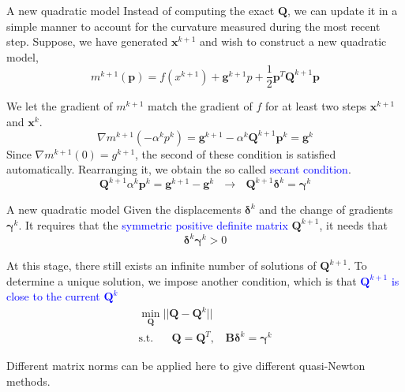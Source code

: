 \documentclass{beamer}
\begin{document}
\begin{frame}{A new quadratic model}
Instead of computing the exact $\boldsymbol{Q}$, we can update it in a simple manner to account for the curvature measured during the most recent step. Suppose, we have generated $\boldsymbol{x}^{k+1}$ and wish to construct a new quadratic model,
\begin{equation*}
    m^{k+1} (\boldsymbol{p}) = f(x^{k+1}) + \boldsymbol{g}^{k+1} p + \frac{1}{2} \boldsymbol{p}^T \boldsymbol{Q}^{k+1} \boldsymbol{p}
\end{equation*}

We let the gradient of $m^{k+1}$ match the gradient of $f$ for at least two steps $\boldsymbol{x}^{k+1}$ and $\boldsymbol{x}^{k}$. 
\begin{equation*}
    \nabla m^{k+1} (-\alpha^k p^k) = \boldsymbol{g}^{k+1} - \alpha^k \boldsymbol{Q}^{k+1} \boldsymbol{p}^k = \boldsymbol{g}^k
\end{equation*}
Since $\nabla m^{k+1}(0)= g^{k+1}$, the second of these condition is satisfied automatically.  
Rearranging it, we obtain the so called \textcolor{blue}{secant condition}.
\begin{equation}
    \boldsymbol{Q}^{k+1} \alpha^k \boldsymbol{p}^k = \boldsymbol{g}^{k+1} - \boldsymbol{g}^k ~~~\rightarrow~~~
    \boldsymbol{Q}^{k+1} \boldsymbol{\delta}^k = \boldsymbol{\gamma}^{k} 
\end{equation}

\end{frame}

\begin{frame}{A new quadratic model}
Given the displacements $\boldsymbol{\delta}^k$ and the change of gradients $\boldsymbol{\gamma}^k$. It requires that the \textcolor{blue}{symmetric
positive definite matrix} $\boldsymbol{Q}^{k+1}$, it needs that
\begin{equation*}
    \boldsymbol{\delta}^{k}\boldsymbol{\gamma}^{k} > 0    
\end{equation*}

At this stage, there still exists an infinite number of solutions of $\boldsymbol{Q}^{k+1}$. To determine a unique solution, we impose another condition, which is that \textcolor{blue}{$\boldsymbol{Q}^{k+1}$ is close to the current $\boldsymbol{Q}^{k}$}
\begin{gather*}
    \underset{\boldsymbol{Q}}{\min} ||\boldsymbol{Q} - \boldsymbol{Q}^{k}|| \\
    \textrm{s.t.~~~~~} \boldsymbol{Q} = \boldsymbol{Q}^T,~~~~    \boldsymbol{B \delta}^k = \boldsymbol{\gamma}^k
\end{gather*}

Different matrix norms can be applied here to give different quasi-Newton methods.

\end{frame}
\end{document}
